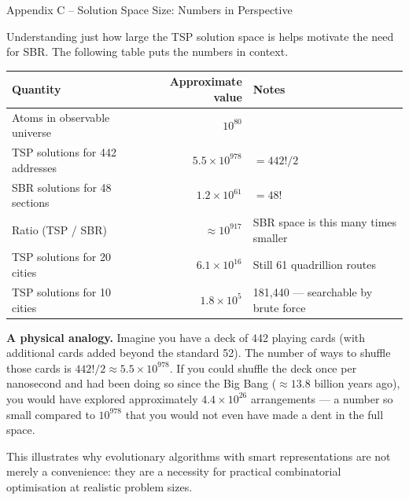 \documentclass[aspectratio=169,10pt]{beamer}
\begin{document}
\begin{frame}[allowframebreaks]{Appendix C -- Solution Space Size: Numbers in Perspective}

  Understanding just how large the TSP solution space is helps motivate the
  need for SBR.  The following table puts the numbers in context.

  \begin{center}
    \begin{tabular}{lrl}
      \toprule
      \textbf{Quantity} & \textbf{Approximate value} & \textbf{Notes} \\
      \midrule
      Atoms in observable universe & $10^{80}$ & \\
      TSP solutions for 442 addresses & $5.5 \times 10^{978}$ &
            $= 442!/2$ \\
      SBR solutions for 48 sections  & $1.2 \times 10^{61}$ &
            $= 48!$ \\
      Ratio (TSP / SBR)              & $\approx 10^{917}$ &
            SBR space is this many times smaller \\
      TSP solutions for 20 cities    & $6.1 \times 10^{16}$ &
            Still 61 quadrillion routes \\
      TSP solutions for 10 cities    & $1.8 \times 10^{5}$ &
            181,440 --- searchable by brute force \\
      \bottomrule
    \end{tabular}
  \end{center}

  \textbf{A physical analogy.}  Imagine you have a deck of 442 playing cards
  (with additional cards added beyond the standard 52).  The number of ways to
  shuffle those cards is $442! / 2 \approx 5.5 \times 10^{978}$.  If you could
  shuffle the deck once per nanosecond and had been doing so since the Big Bang
  ($\approx 13.8$ billion years ago), you would have explored approximately
  $4.4 \times 10^{26}$ arrangements --- a number so small compared to $10^{978}$
  that you would not even have made a dent in the full space.

  This illustrates why evolutionary algorithms with smart representations are
  not merely a convenience: they are a necessity for practical combinatorial
  optimisation at realistic problem sizes.

\end{frame}
\end{document}
